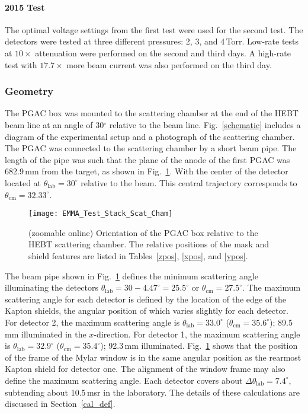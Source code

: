  \paragraph{2015 Test} The optimal voltage settings from the first test were used for the second test. The detectors were tested at three different pressures: 2, 3, and 4\,Torr. Low-rate tests at $10\times$ attenuation were  performed on the second and third days. A high-rate test with $17.7\times$ more beam current was also performed on the third day.
\subsubsection{Geometry}
The PGAC box was mounted to the scattering chamber at the end of the HEBT beam line at an angle of 30$^\circ$ relative to the beam line.  Fig.~\ref{schematic} includes a diagram of the experimental setup and a photograph of the scattering chamber. The PGAC was connected to the scattering chamber by a short beam pipe.  The length of the pipe was such that the plane of the %
anode of the first PGAC was 682.9\,mm from the target, as shown in Fig.~\ref{rays}.  With the center of the detector located at $\theta_\textrm{lab}=30^\circ$ relative to the beam.  This central trajectory corresponds to $\theta_\textrm{cm}=32.33^\circ$.

\begin{figure}
\centering
\texttt{[image: EMMA\_Test\_Stack\_Scat\_Cham]}
\caption{(zoomable online) Orientation of the PGAC box relative to the HEBT scattering chamber. The relative positions of the mask and shield features are listed in Tables~\ref{zpos}, \ref{xpos}, and \ref{ypos}.}
\label{rays}
\end{figure}

The beam pipe shown in Fig.~\ref{rays} defines the minimum scattering angle illuminating the detectors $\theta_\textrm{lab}=30-4.47^\circ=25.5^\circ$ or $\theta_\textrm{cm}=27.5^\circ$.
The maximum scattering angle for each detector is defined by the %
location of the edge of the Kapton shields, the angular position of which varies slightly for each detector.  For detector 2, the maximum scattering angle is $\theta_\textrm{lab}=33.0^\circ$ ($\theta_\textrm{cm}=35.6^\circ$); 89.5\,mm illuminated in the $x$-direction. For detector 1, the maximum scattering angle is $\theta_\textrm{lab}=32.9^\circ$ ($\theta_\textrm{cm}=35.4^\circ$); 92.3\,mm illuminated.
Fig.~\ref{rays} shows that the position of the frame of the Mylar window is in the same angular position as the rearmost Kapton shield for detector one. The alignment of the window frame may also define the maximum scattering angle.
Each detector covers about $\Delta \theta_\textrm{lab}=7.4^\circ$, subtending about 10.5\,msr in the laboratory.  The details of these calculations are discussed in Section~\ref{cal_def}.
